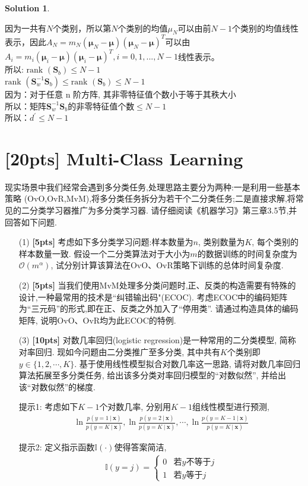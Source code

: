 \documentclass[a4paper,UTF8]{article}
\numberwithin{equation}{section}
\theoremstyle{definition}
\newtheorem*{solution}{Solution}
\newcommand{\bds}{\boldsymbol}
\def \x {\mathbf{x}}
\newcommand\given[1][]{\:#1\vert\:}
\begin{document}
\begin{solution}
\begin{enumerate}
		因为一共有$N$个类别，所以第$N$个类别的均值$\mu_N$可以由前$N-1$个类别的均值线性表示，因此$A_N = m_N(\bds{\mu}_N-\bds{\mu})(\bds{\mu}_N-\bds{\mu})^T$可以由$A_i = m_i(\bds{\mu}_i-\bds{\mu})(\bds{\mu}_i-\bds{\mu})^T, i=0,1, ..., N-1$线性表示。\\
		所以: $\text{rank }(\textbf{S}_b) \leq N-1$ \\
		$\text{rank }(\textbf{S}_w^{-1}\textbf{S}_b) \leq \text{rank }(\textbf{S}_b) \leq N-1$ \\
		因为：对于任意 n 阶方阵, 其非零特征值个数小于等于其秩大小 \\
		所以：矩阵$\textbf{S}_w^{-1}\textbf{S}_b$的非零特征值个数$\leq N-1$ \\
		所以：$d^{'} \leq N-1$
	\end{enumerate}
\end{solution}

\newpage

\section{[20pts] Multi-Class Learning}
现实场景中我们经常会遇到多分类任务,处理思路主要分为两种:一是利用一些基本策略
(OvO,OvR,MvM),将多分类任务拆分为若干个二分类任务;二是直接求解,将常见的二分类学习器推广为多分类学习器. 请仔细阅读《机器学习》第三章3.5节,并回答如下问题.
\begin{enumerate}
	\item[(1)] \textbf{[5pts]}  考虑如下多分类学习问题:样本数量为$n$, 类别数量为$K$, 每个类别的样本数量一致. 假设一个二分类算法对于大小为$m$的数据训练的时间复杂度为$\mathcal{O}(m^\alpha)$, 试分别计算该算法在OvO、OvR策略下训练的总体时间复杂度.
	\item[(2)] \textbf{[5pts]}  当我们使用MvM处理多分类问题时,正、反类的构造需要有特殊的设计,一种最常用的技术是“纠错输出码"(ECOC). 考虑ECOC中的编码矩阵为“三元码”的形式,即在正、反类之外加入了“停用类”. 请通过构造具体的编码矩阵, 说明OvO、OvR均为此ECOC的特例.
	\item[(3)] \textbf{[10pts]}  对数几率回归(logistic regression)是一种常用的二分类模型, 简称对率回归. 现如今问题由二分类推广至多分类, 其中共有$K$个类别即$y \in \{1,2,\cdots, K\}$. 基于使用线性模型拟合对数几率这一思路, 请将对数几率回归算法拓展至多分类任务,
	给出该多分类对率回归模型的“对数似然”, 并给出该“对数似然”的梯度.

	提示1: 考虑如下$K-1$个对数几率, 分别用$K-1$组线性模型进行预测,
	\begin{align*}
		\ln{\frac{p(y=1 \given \x)}{p(y=K \given \x)}}, \ln{\frac{p(y=2 \given \x)}{p(y=K \given \x)}}, \cdots, \ln{\frac{p(y=K-1 \given \x)}{p(y=K \given \x)}}
	\end{align*}

	提示2: 定义指示函数$\mathbb{I}(\cdot)$使得答案简洁,
	\begin{align*}
		\mathbb{I}(y = j) = \begin{cases}
			0 & \text{若$y$不等于$j$} \\
			1 & \text{若$y$等于$j$}
		\end{cases}
	\end{align*}


\end{enumerate}
\end{document}
